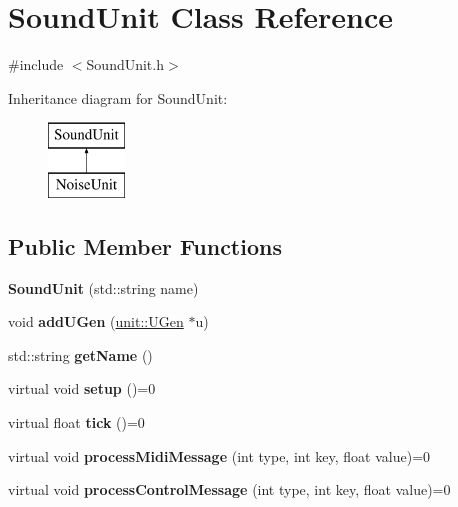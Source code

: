 \hypertarget{classSoundUnit}{}\section{Sound\+Unit Class Reference}
\label{classSoundUnit}


{\ttfamily \#include $<$Sound\+Unit.\+h$>$}

Inheritance diagram for Sound\+Unit\+:\begin{figure}[H]
\begin{center}
\leavevmode
\includegraphics[height=2.000000cm]{classSoundUnit}
\end{center}
\end{figure}
\subsection*{Public Member Functions}
\begin{DoxyCompactItemize}
\item 
{\bfseries Sound\+Unit} (std\+::string name)\hypertarget{classSoundUnit_a3220665fe1e433d1b0d90fa328e71133}{}\label{classSoundUnit_a3220665fe1e433d1b0d90fa328e71133}

\item 
void {\bfseries add\+U\+Gen} (\hyperlink{classunit_1_1UGen}{unit\+::\+U\+Gen} $\ast$u)\hypertarget{classSoundUnit_a3c4fb09e94703dd7f7d17ca5cb7bb561}{}\label{classSoundUnit_a3c4fb09e94703dd7f7d17ca5cb7bb561}

\item 
std\+::string {\bfseries get\+Name} ()\hypertarget{classSoundUnit_a4854dfb9b839ff33d061ed013fbf3ef9}{}\label{classSoundUnit_a4854dfb9b839ff33d061ed013fbf3ef9}

\item 
virtual void {\bfseries setup} ()=0\hypertarget{classSoundUnit_aedfa9b99f4555ed5df4ceffe001c1e63}{}\label{classSoundUnit_aedfa9b99f4555ed5df4ceffe001c1e63}

\item 
virtual float {\bfseries tick} ()=0\hypertarget{classSoundUnit_af1f6ccffb8d1919bd774b340c01bea68}{}\label{classSoundUnit_af1f6ccffb8d1919bd774b340c01bea68}

\item 
virtual void {\bfseries process\+Midi\+Message} (int type, int key, float value)=0\hypertarget{classSoundUnit_a1e73f915afac67a2103f8d79daf40ec3}{}\label{classSoundUnit_a1e73f915afac67a2103f8d79daf40ec3}

\item 
virtual void {\bfseries process\+Control\+Message} (int type, int key, float value)=0\hypertarget{classSoundUnit_ad20e07c321b9d206f0f9303bbdf2a67d}{}\label{classSoundUnit_ad20e07c321b9d206f0f9303bbdf2a67d}

\end{DoxyCompactItemize}
